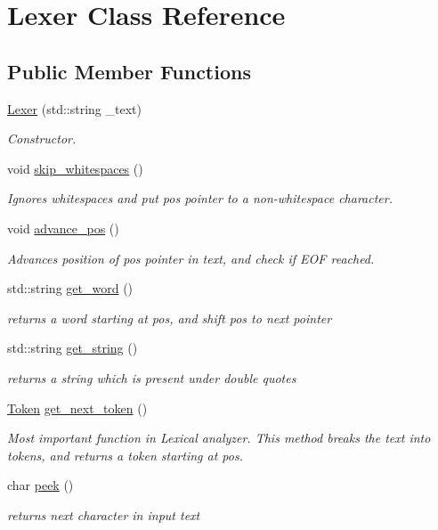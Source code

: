 \hypertarget{classLexer}{}\section{Lexer Class Reference}
\label{classLexer}
\subsection*{Public Member Functions}
\begin{DoxyCompactItemize}
\item 
\hyperlink{classLexer_aacbf403ef967d64e32d3d22848791184}{Lexer} (std\+::string \+\_\+text)
\begin{DoxyCompactList}\small\item\em Constructor. \end{DoxyCompactList}\item 
void \hyperlink{classLexer_a648cdfba0f233781e0a4388e80791e83}{skip\+\_\+whitespaces} ()
\begin{DoxyCompactList}\small\item\em Ignores whitespaces and put pos pointer to a non-\/whitespace character. \end{DoxyCompactList}\item 
void \hyperlink{classLexer_a3486f1d70609a2312374502e0eb73f3a}{advance\+\_\+pos} ()
\begin{DoxyCompactList}\small\item\em Advances position of pos pointer in text, and check if E\+OF reached. \end{DoxyCompactList}\item 
std\+::string \hyperlink{classLexer_af1457c31191cd094666ef97a5308614c}{get\+\_\+word} ()
\begin{DoxyCompactList}\small\item\em returns a word starting at pos, and shift pos to next pointer \end{DoxyCompactList}\item 
std\+::string \hyperlink{classLexer_adb52f7342b8fd8ebd4405847b7dccccf}{get\+\_\+string} ()
\begin{DoxyCompactList}\small\item\em returns a string which is present under double quotes \end{DoxyCompactList}\item 
\hyperlink{classToken}{Token} \hyperlink{classLexer_a86fa075d74f569a9632f7810afcc6e26}{get\+\_\+next\+\_\+token} ()
\begin{DoxyCompactList}\small\item\em Most important function in Lexical analyzer. This method breaks the text into tokens, and returns a token starting at pos. \end{DoxyCompactList}\item 
char \hyperlink{classLexer_a5a1759fc923de89d2cdb709faa0ed3a1}{peek} ()
\begin{DoxyCompactList}\small\item\em returns next character in input text \end{DoxyCompactList}\end{DoxyCompactItemize}

